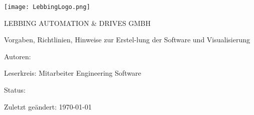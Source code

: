 \begin{titlepage}

    
    \begin{center} 
    \texttt{[image: LebbingLogo.png]}
    \par\vspace{1.5cm}
    {\scshape\Large LEBBING AUTOMATION \& DRIVES GMBH\par}
    \vspace{2cm}
    
    {\Huge\textbf{\titlename}\par}
    \vspace{0.5cm}
    {\Large Vorgaben, Richtlinien, Hinweise zur Erstel-lung der Software und Visualisierung\par}
    \vspace{1.5cm}
\end{center}
    
        {\large Autoren:   \authorname~\par}
        {\large Leserkreis:  Mitarbeiter Engineering Software \par}
        {\large Status:   \state~\par}
        {\large Zuletzt geändert:   \today~\par}
        

    
   
    
    \end{titlepage}